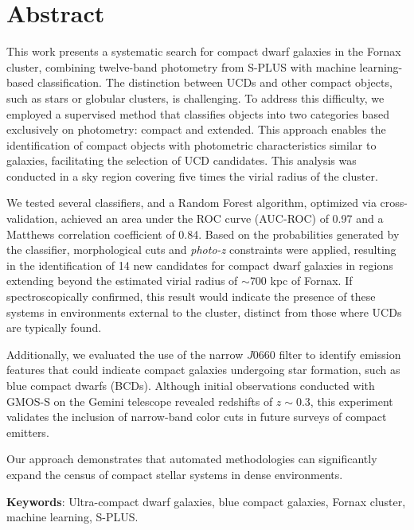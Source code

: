 \chapter*{Abstract}
This work presents a systematic search for compact dwarf galaxies in the Fornax cluster, combining twelve-band photometry from S-PLUS with machine learning-based classification. The distinction between UCDs and other compact objects, such as stars or globular clusters, is challenging. To address this difficulty, we employed a supervised method that classifies objects into two categories based exclusively on photometry: compact and extended. This approach enables the identification of compact objects with photometric characteristics similar to galaxies, facilitating the selection of UCD candidates. This analysis was conducted in a sky region covering five times the virial radius of the cluster.

We tested several classifiers, and a Random Forest algorithm, optimized via cross-validation, achieved an area under the ROC curve (AUC-ROC) of 0.97 and a Matthews correlation coefficient of 0.84. Based on the probabilities generated by the classifier, morphological cuts and \textit{photo-z} constraints were applied, resulting in the identification of 14 new candidates for compact dwarf galaxies in regions extending beyond the estimated virial radius of $\sim700$ kpc of Fornax. If spectroscopically confirmed, this result would indicate the presence of these systems in environments external to the cluster, distinct from those where UCDs are typically found.

Additionally, we evaluated the use of the narrow $J0660$ filter to identify emission features that could indicate compact galaxies undergoing star formation, such as blue compact dwarfs (BCDs). Although initial observations conducted with GMOS-S on the Gemini telescope revealed redshifts of $z \sim 0.3$, this experiment validates the inclusion of narrow-band color cuts in future surveys of compact emitters.

Our approach demonstrates that automated methodologies can significantly expand the census of compact stellar systems in dense environments.

\textbf{Keywords}: Ultra-compact dwarf galaxies, blue compact galaxies, Fornax cluster, machine learning, S-PLUS.

\thispagestyle{empty}